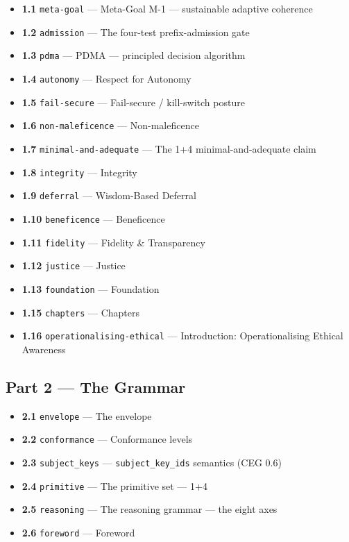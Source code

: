 \documentclass[11pt]{article}
\begin{document}
\begin{itemize}\setlength\itemsep{0pt}
\item \textbf{1.1} \texttt{meta-goal} — Meta-Goal M-1 — sustainable adaptive coherence
\item \textbf{1.2} \texttt{admission} — The four-test prefix-admission gate
\item \textbf{1.3} \texttt{pdma} — PDMA — principled decision algorithm
\item \textbf{1.4} \texttt{autonomy} — Respect for Autonomy
\item \textbf{1.5} \texttt{fail-secure} — Fail-secure / kill-switch posture
\item \textbf{1.6} \texttt{non-maleficence} — Non-maleficence
\item \textbf{1.7} \texttt{minimal-and-adequate} — The 1+4 minimal-and-adequate claim
\item \textbf{1.8} \texttt{integrity} — Integrity
\item \textbf{1.9} \texttt{deferral} — Wisdom-Based Deferral
\item \textbf{1.10} \texttt{beneficence} — Beneficence
\item \textbf{1.11} \texttt{fidelity} — Fidelity \& Transparency
\item \textbf{1.12} \texttt{justice} — Justice
\item \textbf{1.13} \texttt{foundation} — Foundation
\item \textbf{1.15} \texttt{chapters} — Chapters
\item \textbf{1.16} \texttt{operationalising-ethical} — Introduction: Operationalising Ethical Awareness
\end{itemize}


\subsection*{Part 2 — The Grammar}


\begin{itemize}\setlength\itemsep{0pt}
\item \textbf{2.1} \texttt{envelope} — The envelope
\item \textbf{2.2} \texttt{conformance} — Conformance levels
\item \textbf{2.3} \texttt{subject\_keys} — \texttt{subject\_key\_ids} semantics (CEG 0.6)
\item \textbf{2.4} \texttt{primitive} — The primitive set — 1+4
\item \textbf{2.5} \texttt{reasoning} — The reasoning grammar — the eight axes
\item \textbf{2.6} \texttt{foreword} — Foreword
\end{itemize}
\end{document}
